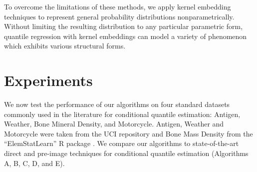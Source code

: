 \documentclass[twoside]{article} \usepackage{aistats2017}
\theoremstyle{definition}
\theoremstyle{theorem}
\begin{document}
	To overcome the limitations of these methods, we apply kernel embedding techniques to represent general probability distributions nonparametrically. Without limiting the resulting distribution to any particular parametric form, quantile regression with kernel embeddings can model a variety of phenomenon which exhibits various structural forms.
	
% 
% 
	

	
\section{Experiments}
\label{sec:experiments}
		
	We now test the performance of our algorithms on four standard datasets commonly used in the literature for conditional quantile estimation: Antigen, Weather, Bone Mineral Density, and Motorcycle. Antigen, Weather and Motorcycle were taken from the UCI repository \citep{lichman2013uci} and Bone Mass Density from the ``ElemStatLearn'' R package \citep{hastie2005the}. We compare our algorithms to state-of-the-art direct and pre-image techniques for conditional quantile estimation (Algorithms A, B, C, D, and E).
	
%	
	
\end{document}
